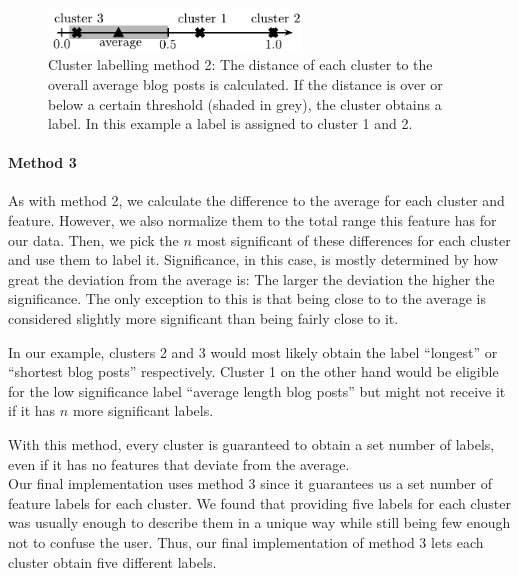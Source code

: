 \begin{figure}[ht]
	\centering
	\includegraphics[width=0.6\textwidth]{images/cluster_labeling_2.pdf}
	\caption{Cluster labelling method 2: The distance of each cluster to the overall average blog posts is calculated. If the distance is over or below a certain threshold (shaded in grey), the cluster obtains a label. In this example a label is assigned to cluster 1 and 2.}
	\label{fig:cluster_labeling_2}
\end{figure}


\paragraph{Method 3}
As with method 2, we calculate the difference to the average for each cluster and feature.
However, we also normalize them to the total range this feature has for our data.
Then, we pick the $n$ most significant of these differences for each cluster and use them to label it.
Significance, in this case, is mostly determined by how great the deviation from the average is: The larger the deviation the higher the significance.
The only exception to this is that being close to to the average is considered slightly more significant than being fairly close to it.

In our example, clusters 2 and 3 would most likely obtain the label ``longest'' or ``shortest blog posts'' respectively.
Cluster 1 on the other hand would be eligible for the low significance label ``average length blog posts'' but might not receive it if it has $n$ more significant labels.

With this method, every cluster is guaranteed to obtain a set number of labels, even if it has no features that deviate from the average. \\


Our final implementation uses method 3 since it guarantees us a set number of feature labels for each cluster.
We found that providing five labels for each cluster was usually enough to describe them in a unique way while still being few enough not to confuse the user.
Thus, our final implementation of method 3 lets each cluster obtain five different labels.
